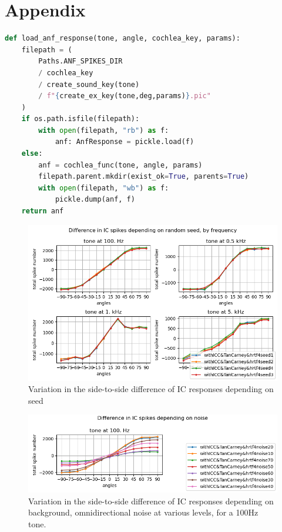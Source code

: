 \documentclass[11pt,a4paper]{article}
\begin{document}
\newpage


\newpage
\appendix{}
\section*{Appendix}
\begin{lstlisting}[language=Python]
def load_anf_response(tone, angle, cochlea_key, params):
	filepath = (
        Paths.ANF_SPIKES_DIR
        / cochlea_key
        / create_sound_key(tone)
        / f"{create_ex_key(tone,deg,params)}.pic"
    )
    if os.path.isfile(filepath):
        with open(filepath, "rb") as f:
            anf: AnfResponse = pickle.load(f)
    else:
        anf = cochlea_func(tone, angle, params)
        filepath.parent.mkdir(exist_ok=True, parents=True)
        with open(filepath, "wb") as f:
            pickle.dump(anf, f)
    return anf
\end{lstlisting}\label{code:cache}
\begin{figure}[H]
    \centering
    \includegraphics[width=0.75\linewidth]{Images/iccdiff_by_seed.png}
    \caption{Variation in the side-to-side difference of IC responses depending on seed}
    \label{fig:iccdiff-by-seed}
\end{figure}
\begin{figure}[H]
    \centering
    \includegraphics[width=0.5\linewidth]{Images/ICdiffbyNOISE.png}
    \caption{Variation in the side-to-side difference of IC responses depending on background, omnidirectional noise at various levels, for a 100Hz tone.}
    \label{fig:iccdiff-by-noise}
\end{figure}
\cleardoublepage
\end{document}
